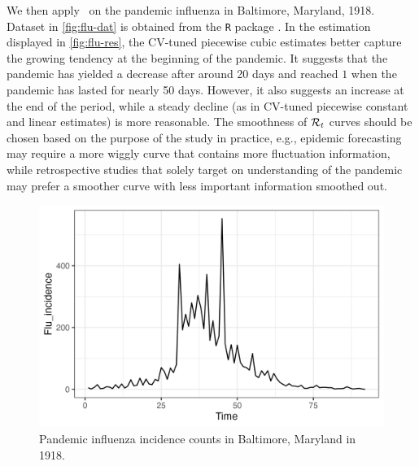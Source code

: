 We then apply \RtEstim\ on the pandemic influenza in Baltimore, Maryland, 1918. Dataset in \autoref{fig:flu-dat} is obtained from the \texttt{R} package \EpiEstim. In the estimation displayed in \autoref{fig:flu-res}, the CV-tuned piecewise cubic estimates better capture the growing tendency at the beginning of the pandemic. It suggests that the pandemic has yielded a decrease after around 20 days and reached $1$ when the pandemic has lasted for nearly 50 days. However, it also suggests an increase at the end of the period, while a steady decline (as in CV-tuned piecewise constant and linear estimates) is more reasonable. The smoothness of $\mathcal{R}_t$ curves should be chosen based on the purpose of the study in practice, e.g., epidemic forecasting may require a more wiggly curve that contains more fluctuation information, while retrospective studies that solely target on understanding of the pandemic may prefer a smoother curve with less important information smoothed out. 
\begin{figure}[tb]
    \centering
    \includegraphics[width=0.9\linewidth]{fig/flu_dat.png}
    \caption{Pandemic influenza incidence counts in Baltimore, Maryland in 1918.} 
    \label{fig:flu-dat}
\end{figure} 

